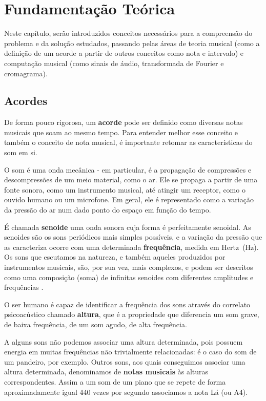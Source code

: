 \chapter{Fundamentação Teórica}
\label{cap:fundamentacao}

Neste capítulo, serão introduzidos conceitos necessários para a compreensão do problema e da solução estudados, passando pelas áreas de teoria musical (como a definição de um acorde a partir de outros conceitos como nota e intervalo) e computação musical (como sinais de áudio, transformada de Fourier e cromagrama).

\section{Acordes}
    
    De forma pouco rigorosa, um \textbf{acorde} pode ser definido como diversas notas musicais que soam ao mesmo tempo. Para entender melhor esse conceito e também o conceito de nota musical, é importante retomar as características do som em si.
    
    O som é uma onda mecânica - em particular, é a propagação de compressões e descompressões de um meio material, como o ar. Ele se propaga a partir de uma fonte sonora, como um instrumento musical, até atingir um receptor, como o ouvido humano ou um microfone. Em geral, ele é representado como a variação da pressão do ar num dado ponto do espaço em função do tempo.

    É chamada \textbf{senoide} uma onda sonora cuja forma é perfeitamente senoidal. As senoides são os sons periódicos mais simples possíveis, e a variação da pressão que as caracteriza ocorre com uma determinada \textbf{frequência}, medida em Hertz~(Hz). Os sons que escutamos na natureza, e também aqueles produzidos por instrumentos musicais, são, por sua vez, mais complexos, e podem ser descritos como uma composição (soma) de infinitas senoides com diferentes amplitudes e frequências \citep[ver][seção 2.1]{muller}.

    O ser humano é capaz de identificar a frequência dos sons através do correlato psicoacústico chamado \textbf{altura}, que é a propriedade que diferencia um som grave, de baixa frequência, de um som agudo, de alta frequência.

    A alguns sons não podemos associar uma altura determinada, pois possuem energia em muitas frequências não trivialmente relacionadas: é o caso do som de um pandeiro, por exemplo. Outros sons, aos quais conseguimos associar uma altura determinada, denominamos de \textbf{notas musicais} às alturas correspondentes. Assim a um som de um piano que se repete de forma aproximadamente igual 440 vezes por segundo associamos a nota Lá (ou A4).
    
